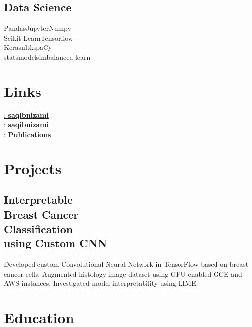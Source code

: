\documentclass[]{snizami-resume}
\begin{document}
\begin{minipage}[t]{0.26\textwidth}
\subsection{Data Science}
Pandas\textbullet{}Jupyter\textbullet{}Numpy\textbullet{}\\
Scikit-Learn\textbullet{}Tensorflow\textbullet{}\\
Keras\textbullet{}nltk\textbullet{}spaCy\textbullet{}\\
statsmodels\textbullet{}imbalanced-learn
\sectionsep


\section{Links} 

\href{https://github.com/saqibnizami}{\faGithub: \bf saqibnizami} \\
\href{https://www.linkedin.com/in/saqibnizami}{\faLinkedin: \bf saqibnizami} \\
\href{https://www.researchgate.net/profile/Saqib-Nizami/publications}{\aiResearchGateSquare: \bf Publications}
\sectionsep

\section{Projects}

\subsection{Interpretable \\
Breast Cancer \\
Classification \\
using Custom CNN}
Developed custom Convolutional Neural Network in TensorFlow based on breast cancer cells. Augmented histology image dataset using GPU-enabled GCE and AWS instances. Investigated model interpretability using LIME.
\sectionsep


\section{Education} 


\end{minipage}
\end{document}
